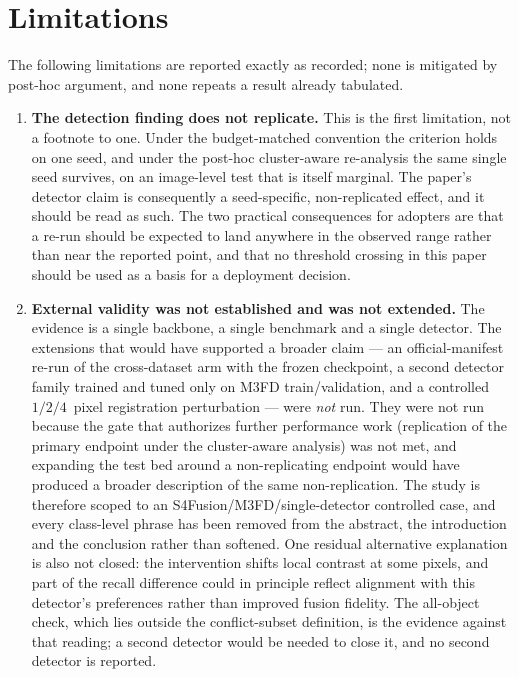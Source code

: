 \documentclass[pdflatex,sn-mathphys-num]{sn-jnl}
\theoremstyle{thmstyleone}%
\theoremstyle{thmstyletwo}%
\theoremstyle{thmstylethree}%
\begin{document}
\section{Limitations}\label{sec:limitations}

The following limitations are reported exactly as recorded; none is mitigated by post-hoc argument, and none repeats a result already tabulated.

\begin{enumerate}
\item \textbf{The detection finding does not replicate.} This is the first limitation, not a footnote to one. Under the budget-matched convention the criterion holds on one seed, and under the post-hoc cluster-aware re-analysis the same single seed survives, on an image-level test that is itself marginal. The paper's detector claim is consequently a seed-specific, non-replicated effect, and it should be read as such. The two practical consequences for adopters are that a re-run should be expected to land anywhere in the observed range rather than near the reported point, and that no threshold crossing in this paper should be used as a basis for a deployment decision.

\item \textbf{External validity was not established and was not extended.} The evidence is a single backbone, a single benchmark and a single detector. The extensions that would have supported a broader claim --- an official-manifest re-run of the cross-dataset arm with the frozen checkpoint, a second detector family trained and tuned only on M3FD train/validation, and a controlled $1/2/4$~pixel registration perturbation --- were \emph{not} run. They were not run because the gate that authorizes further performance work (replication of the primary endpoint under the cluster-aware analysis) was not met, and expanding the test bed around a non-replicating endpoint would have produced a broader description of the same non-replication. The study is therefore scoped to an S4Fusion/M3FD/single-detector controlled case, and every class-level phrase has been removed from the abstract, the introduction and the conclusion rather than softened. One residual alternative explanation is also not closed: the intervention shifts local contrast at some pixels, and part of the recall difference could in principle reflect alignment with this detector's preferences rather than improved fusion fidelity. The all-object check, which lies outside the conflict-subset definition, is the evidence against that reading; a second detector would be needed to close it, and no second detector is reported.


\end{enumerate}
\end{document}
